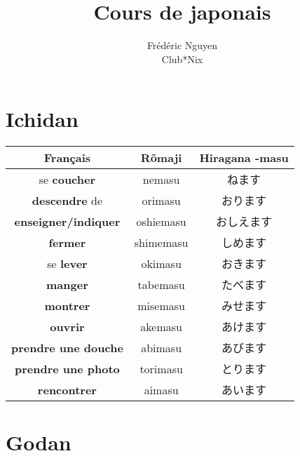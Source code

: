 \documentclass[11pt]{report}
\title{Cours de japonais}
\author{
	Frédéric Nguyen \\ Club*Nix
}
\newenvironment{Japanese}{%
\CJKfamily{min}%
\CJKtilde  
\CJKnospace}{}
\begin{document}
\maketitle
\tableofcontents

\chapter{Ichidan}

\begin{CJK}{UTF8}{}  
\begin{Japanese}
	\begin{center}
		\begin{tabular}{|c|c|c|}
				\hline
				\textbf{Français} & \textbf{Rõmaji} & \textbf{Hiragana -masu} \\
				\hline
				se \textbf{coucher} & nemasu & ねます \\	
				\hline 
				\textbf{descendre} de & orimasu & おります \\
				\hline
				\textbf{enseigner/indiquer} & oshiemasu & おしえます \\
				\hline
				\textbf{fermer} & shimemasu & しめます \\
				\hline
				se \textbf{lever} & okimasu & おきます \\
				\hline
				\textbf{manger} & tabemasu & たべます \\
				\hline
				\textbf{montrer} & misemasu & みせます \\
				\hline
				\textbf{ouvrir} & akemasu & あけます \\
				\hline
				\textbf{prendre une douche} & abimasu & あびます \\
				\hline
				\textbf{prendre une photo} & torimasu & とります \\
				\hline
				\textbf{rencontrer} & aimasu & あいます \\
				\hline
			\end{tabular}
	\end{center}
\end{Japanese}  
\end{CJK}

\chapter{Godan}
\end{document}

